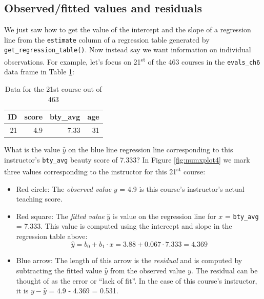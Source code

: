 \documentclass[12pt, krantz2,]{krantz}
\providecommand{\tightlist}{%
  \setlength{\itemsep}{0pt}\setlength{\parskip}{0pt}}
\begin{document}
\hypertarget{model1points}{%
\subsection{Observed/fitted values and residuals}\label{model1points}}

We just saw how to get the value of the intercept and the slope of a regression line from the \texttt{estimate} column of a regression table generated by \texttt{get\_regression\_table()}. Now instead say we want information on individual observations. For example, let's focus on 21\textsuperscript{st} of the 463 courses in the \texttt{evals\_ch6} data frame in Table \ref{tab:instructor-21}:

\begin{table}[H]

\caption{\label{tab:instructor-21}Data for the 21st course out of 463}
\centering
\fontsize{10}{12}\selectfont
\begin{tabular}{rrrr}
\toprule
ID & score & bty\_avg & age\\
\midrule
21 & 4.9 & 7.33 & 31\\
\bottomrule
\end{tabular}
\end{table}

What is the value \(\widehat{y}\) on the blue line regression line corresponding to this instructor's \texttt{bty\_avg} beauty score of 7.333? In Figure \ref{fig:numxplot4} we mark three values corresponding to the instructor for this 21\textsuperscript{st} course:

\begin{itemize}
\tightlist
\item
  Red circle: The \emph{observed value} \(y\) = 4.9 is this course's instructor's actual teaching score.
\item
  Red square: The \emph{fitted value} \(\widehat{y}\) is value on the regression line for \(x\) = \texttt{bty\_avg} = 7.333. This value is computed using the intercept and slope in the regression table above: \[\widehat{y} = b_0 + b_1 \cdot x = 3.88 + 0.067 \cdot 7.333 = 4.369\]
\item
  Blue arrow: The length of this arrow is the \emph{residual} and is computed by subtracting the fitted value \(\widehat{y}\) from the observed value \(y\). The residual can be thought of as the error or ``lack of fit''. In the case of this course's instructor, it is \(y - \widehat{y}\) = 4.9 - 4.369 = 0.531.
\end{itemize}
\end{document}
